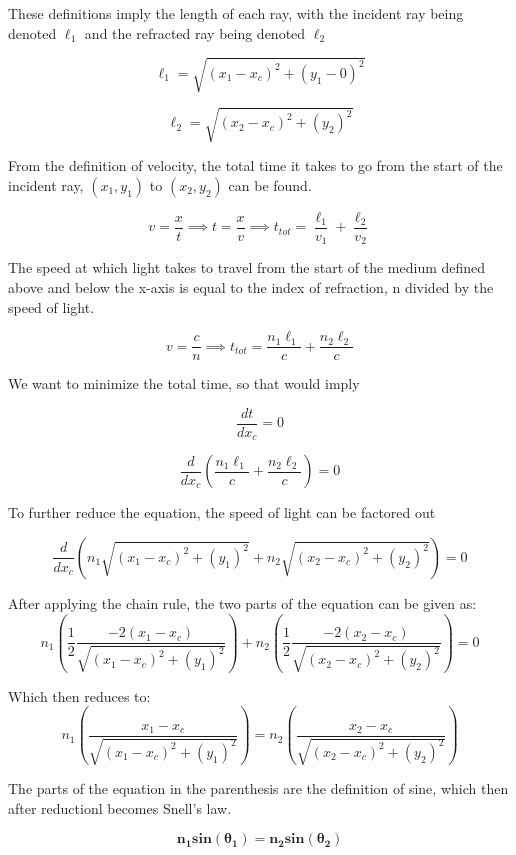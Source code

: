 \documentclass[12pt]{article}
\begin{document}
These definitions imply the length of each ray, with the incident ray being denoted $\ell_1$ and the refracted ray being denoted $\ell_2$

$$
\ell_1 = \sqrt{(x_1 - x_c)^2 + (y_1 - 0)^2} 
$$

$$
\ell_2 = \sqrt{(x_2 - x_c)^2 + (y_2)^2} 
$$

From the definition of velocity, the total time it takes to go from the start of the incident ray, $(x_1, y_1)$ to $(x_2, y_2)$ can be found.

$$
v = \frac{x}{t} \implies t = \frac{x}{v} \implies t_{tot} = \frac{\ell_1}{v_1} + \frac{\ell_2}{v_2}
$$

The speed at which light takes to travel from the start of the medium defined above and below the x-axis is equal to the index of refraction, n divided by the speed of light.

$$
v = \frac{c}{n} \implies t_{tot} = \frac{n_1 \ell_1}{c} + \frac{n_2 \ell_2}{c}
$$

\newpage

We want to minimize the total time, so that would imply

$$
\frac{dt}{d x_c} = 0
$$

$$
\frac{d}{d x_c} ( \frac{n_1 \ell_1}{c} + \frac{n_2 \ell_2}{c} ) = 0
$$

To further reduce the equation, the speed of light can be factored out

$$
\frac{d}{d x_c} ( n_ 1 \sqrt{(x_1 - x_c)^2 + (y_1)^2} + n_ 2 \sqrt{(x_2 - x_c)^2 + (y_2)^2} ) = 0
$$

After applying the chain rule, the two parts of the equation can be given as:
$$
n_1(\frac{1}{2} \frac{-2 (x_1 - x_c)}{\sqrt{(x_1 - x_c)^2 + (y_1)^2}})  + n_2(\frac{1}{2} \frac{-2 (x_2 - x_c)}{\sqrt{(x_2 - x_c)^2 + (y_2)^2}}) = 0
$$

Which then reduces to:
$$
n_1(\frac{x_1 - x_c}{\sqrt{(x_1 - x_c)^2 + (y_1)^2}}) = n_2(\frac{x_2 - x_c}{\sqrt{(x_2 - x_c)^2 + (y_2)^2}})
$$

The parts of the equation in the parenthesis are the definition of sine, which then after reductionl becomes Snell's law.

$$
\boldsymbol{
n_1 sin(\theta_1) = n_2 sin(\theta_2)
}
$$
\end{document}
